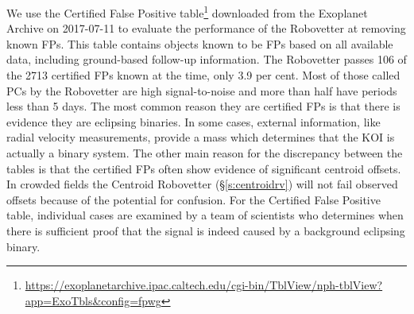 We use the Certified False Positive table\footnote{\url{https://exoplanetarchive.ipac.caltech.edu/cgi-bin/TblView/nph-tblView?app=ExoTbls\&config=fpwg}} downloaded from the Exoplanet Archive on 2017-07-11 to evaluate the performance of the Robovetter at removing known FPs. This table contains objects known to be FPs based on all available data, including ground-based follow-up information.  The Robovetter passes 106 of the 2713 certified FPs known at the time, only 3.9 per cent.  Most of those called PCs by the Robovetter are high signal-to-noise and more than half have periods less than 5 days.  The most common reason they are certified FPs is that there is evidence they are eclipsing binaries. In some cases, external information, like radial velocity measurements, provide a mass which determines that the KOI is actually a binary system. The other main reason for the discrepancy between the tables is that the certified FPs often show evidence of significant centroid offsets. In crowded fields the Centroid Robovetter (\S\ref{s:centroidrv}) will not fail observed offsets because of the potential for confusion. For the Certified False Positive table, individual cases are examined by a team of scientists who determines when there is sufficient proof that the signal is indeed caused by a background eclipsing binary.  

